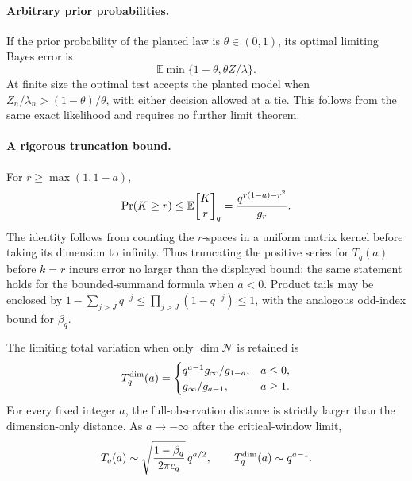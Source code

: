 \paragraph{Arbitrary prior probabilities.}
If the prior probability of the planted law is $\theta\in(0,1)$, its
optimal limiting Bayes error is
\[
 \mathbb E\min\{1-\theta,\theta Z/\lambda\}.
\]
At finite size the optimal test accepts the planted model when
$Z_n/\lambda_n>(1-\theta)/\theta$, with either decision allowed at a tie.
This follows from the same exact likelihood and requires no further
limit theorem.

\paragraph{A rigorous truncation bound.}
For $r\ge\max(1,1-a)$,
\[
 \Pr(K\ge r)\le\mathbb E\qbinom{K}{r}
 =\frac{q^{r(1-a)-r^2}}{g_r}.
\]
The identity follows from counting the $r$-spaces in a uniform matrix
kernel before taking its dimension to infinity. Thus truncating the
positive series for $T_q(a)$ before $k=r$ incurs error no larger than the
displayed bound; the same statement holds for the bounded-summand formula
when $a<0$. Product tails may be enclosed by
$1-\sum_{j>J}q^{-j}\le\prod_{j>J}(1-q^{-j})\le1$, with the analogous
odd-index bound for $\beta_q$.

\begin{corollary}
\label{cor:dimension-gap}
The limiting total variation when only $\dim\mathcal N$ is retained is
\[
 T_q^{\rm dim}(a)=
 \begin{cases}
 q^{a-1}g_\infty/g_{1-a},&a\le0,\\
 g_\infty/g_{a-1},&a\ge1.
 \end{cases}
\]
For every fixed integer $a$, the full-observation distance is strictly
larger than the dimension-only distance. As $a\to-\infty$ after the
critical-window limit,
\[
 T_q(a)\sim\sqrt{\frac{1-\beta_q}{2\pi c_q}}\,q^{a/2},
 \qquad T_q^{\rm dim}(a)\sim q^{a-1}.
\]
\end{corollary}

